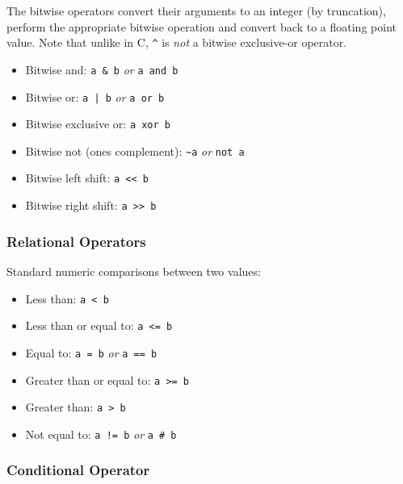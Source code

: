 The bitwise operators convert their arguments to an integer (by truncation), perform the appropriate bitwise operation and 
convert back to a floating point value. Note that unlike in C, \verb|^| is \emph{not} a bitwise exclusive-or operator.

\begin{itemize}\item Bitwise and: \verb|a & b| \emph{or} \verb|a and b|

\item Bitwise or: \verb|a |\verb+|+\verb| b| \emph{or} \verb|a or b|

\item Bitwise exclusive or: \verb|a xor b|

\item Bitwise not (ones complement): \verb|~a| \emph{or} \verb|not a|

\item Bitwise left shift: \verb|a << b|

\item Bitwise right shift: \verb|a >> b|

\end{itemize}\subsubsection{Relational Operators}

Standard numeric comparisons between two values:

\begin{itemize}\item Less than: \verb|a < b|

\item Less than or equal to: \verb|a <= b|

\item Equal to: \verb|a = b| \emph{or} \verb|a == b|

\item Greater than or equal to: \verb|a >= b|

\item Greater than: \verb|a > b|

\item Not equal to: \verb|a != b| \emph{or} \verb|a # b|

\end{itemize}\subsubsection{Conditional Operator}

